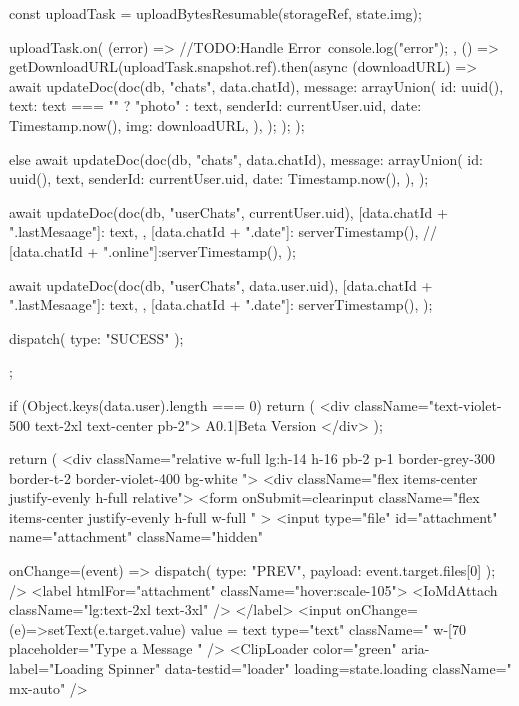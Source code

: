 {{{      const uploadTask = uploadBytesResumable(storageRef, state.img);

      uploadTask.on(
        (error) => {
          //TODO:Handle Error\
          console.log("error");
        },
        () => {
          getDownloadURL(uploadTask.snapshot.ref).then(async (downloadURL) => {
            await updateDoc(doc(db, "chats", data.chatId), {
              message: arrayUnion({
                id: uuid(),
                text: text === "" ? "photo" : text,
                senderId: currentUser.uid,
                date: Timestamp.now(),
                img: downloadURL,
              }),
            });
          });
        }
      );
    } else {
      await updateDoc(doc(db, "chats", data.chatId), {
        message: arrayUnion({
          id: uuid(),
          text,
          senderId: currentUser.uid,
          date: Timestamp.now(),
        }),
      });
    }

    await updateDoc(doc(db, "userChats", currentUser.uid), {
      [data.chatId + ".lastMesaage"]: {
        text,
      },
      [data.chatId + ".date"]: serverTimestamp(),
      // [data.chatId + ".online"]:serverTimestamp(),
    });

    await updateDoc(doc(db, "userChats", data.user.uid), {
      [data.chatId + ".lastMesaage"]: {
        text,
      },
      [data.chatId + ".date"]: serverTimestamp(),
    });

    dispatch({ type: "SUCESS" });
  };

  if (Object.keys(data.user).length === 0) {
    return (
      <div className="text-violet-500 text-2xl text-center pb-2">
        A0.1|Beta Version
      </div>
    );
  }

  return (
    <div className="relative w-full lg:h-14  h-16  pb-2 p-1 border-grey-300 border-t-2 border-violet-400  bg-white  ">
      <div className="flex items-center justify-evenly h-full  relative">
        <form
          onSubmit={clearinput}
          className="flex items-center justify-evenly h-full w-full "
        >
          <input
            type="file"
            id="attachment"
            name="attachment"
            className="hidden"
       
            onChange={(event) => {
              dispatch({ type: "PREV", payload: event.target.files[0] });
            }}
          />
          <label htmlFor="attachment" className="hover:scale-105">
            <IoMdAttach className="lg:text-2xl text-3xl" />
          </label>
          <input
            onChange={(e)=>setText(e.target.value)}
            value = {text}
            type="text"
            className=" w-[70%
            placeholder="Type a Message  "
          />
          <ClipLoader
            color={"green"}
            aria-label="Loading Spinner"
            data-testid="loader"
            loading={state.loading}
            className=" mx-auto"
          />

}
